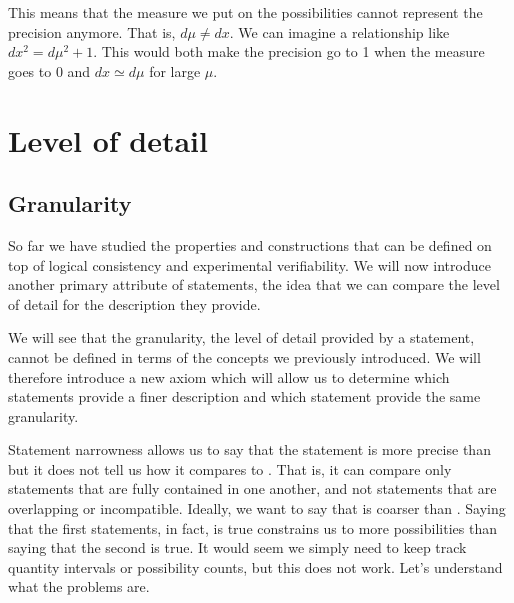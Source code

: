 \documentclass[11pt,letterpaper,fleqn]{memoir} %
\begin{document}
This means that the measure we put on the possibilities cannot represent the precision anymore. That is, $d\mu \neq dx$. We can imagine a relationship like $dx^2 = d\mu^2 + 1$. This would both make the precision go to 1 when the measure goes to 0 and $dx \simeq d\mu$ for large $\mu$.


\iffalse

\chapter{Level of detail}

\section{Granularity}

So far we have studied the properties and constructions that can be defined on top of logical consistency and experimental verifiability. We will now  introduce another primary attribute of statements, the idea that we can compare the level of detail for the description they provide.

We will see that the granularity, the level of detail provided by a statement, cannot be defined in terms of the concepts we previously introduced. We will therefore introduce a new axiom which will allow us to determine which statements provide a finer description and which statement provide the same granularity.

Statement narrowness allows us to say that the statement  is more precise than  but it does not tell us how it compares to . That is, it can compare only statements that are fully contained in one another, and not statements that are overlapping or incompatible. Ideally, we want to say that  is coarser than . Saying that the first statements, in fact, is true constrains us to more possibilities than saying that the second is true. It would seem we simply need to keep track quantity intervals or possibility counts, but this does not work. Let's understand what the problems are.
\end{document}
